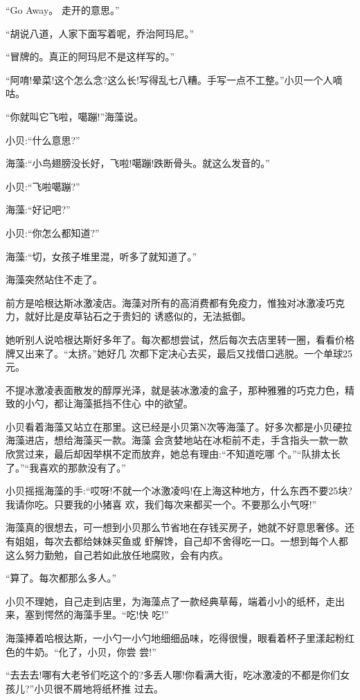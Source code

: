 \documentclass[11pt,a4paper,onecolumn]{article}
\begin{document}
``Go Away。 走开的意思。''

``胡说八道，人家下面写着呢，乔治阿玛尼。''

``冒牌的。真正的阿玛尼不是这样写的。''

``阿唷!晕菜!这个怎么念?这么长!写得乱七八糟。手写一点不工整。''小贝一个人嘀咕。

``你就叫它飞啦，噶蹦!''海藻说。

小贝:``什么意思?''

海藻:``小鸟翅膀没长好，飞啦!噶蹦!跌断骨头。就这么发音的。''

小贝:``飞啦噶蹦?''

海藻:``好记吧?''

小贝:``你怎么都知道?''

海藻:``切，女孩子堆里混，听多了就知道了。''

海藻突然站住不走了。

前方是哈根达斯冰激凌店。海藻对所有的高消费都有免疫力，惟独对冰激凌巧克力，就好比是皮草钻石之于贵妇的
诱惑似的，无法抵御。

她听别人说哈根达斯好多年了。每次都想尝试，然后每次去店里转一圈，看看价格牌又出来了。``太挤。''她好几
次都下定决心去买，最后又找借口逃脱。一个单球25元。

不提冰激凌表面散发的醇厚光泽，就是装冰激凌的盒子，那种雅雅的巧克力色，精致的小勺，都让海藻抵挡不住心
中的欲望。

小贝看着海藻又站立在那里。这已经是小贝第N次等海藻了。好多次都是小贝硬拉海藻进店，想给海藻买一款。海藻
会贪婪地站在冰柜前不走，手含指头一款一款欣赏过来，最后却因举棋不定而放弃，她总有理由:``不知道吃哪
个。''``队排太长了。''``我喜欢的那款没有了。''

小贝摇摇海藻的手:``哎呀!不就一个冰激凌吗!在上海这种地方，什么东西不要25块?我请你吃。只要我的小猪喜
欢，我们每次来都买一个。不要那么小气呀!''

海藻真的很想去，可一想到小贝那么节省地在存钱买房子，她就不好意思奢侈。还有姐姐，每次去都给妹妹买鱼或
虾解馋，自己却不舍得吃一口。一想到每个人都这么努力勤勉，自己若如此放任地腐败，会有内疚。

``算了。每次都那么多人。''

小贝不理她，自己走到店里，为海藻点了一款经典草莓，端着小小的纸杯，走出来，塞到愕然的海藻手里。``吃!快
吃!''

海藻捧着哈根达斯，一小勺一小勺地细细品味，吃得很慢，眼看着杯子里漾起粉红色的牛奶。``化了，小贝，你尝
尝!''

``去去去!哪有大老爷们吃这个的?多丢人哪!你看满大街，吃冰激凌的不都是你们女孩儿?''小贝很不屑地将纸杯推
过去。
\end{document}
